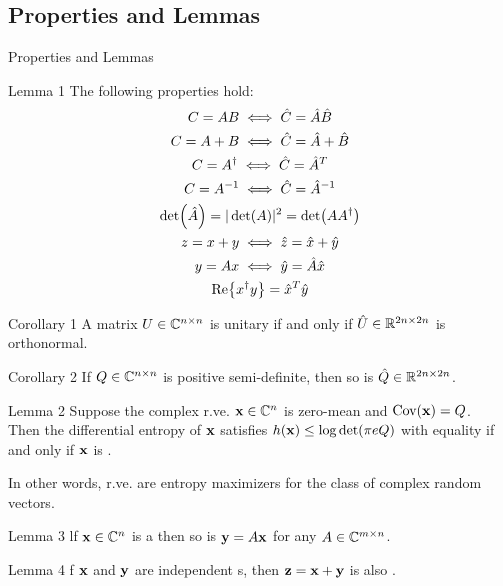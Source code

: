 \subsection{Properties and Lemmas}
\begin{frame}[allowframebreaks]{Properties and Lemmas}
\begin{block}{Lemma 1}
	The following properties hold:
	\begin{subequations}
	\begin{gather}
	C=AB \iff \hat{C} = \hat{A}\hat{B}\\
	C = A+B \iff \hat{C} = \hat{A} + \hat{B}\\
	C = A^\dagger \iff \hat{C}=\hat{A}^T\\
	C=A^{-1} \iff \hat{C} = \hat{A}^{-1}\\
	\det(\hat{A}) = |\det(A)|^2 = \det(A A^\dagger)\\
	z = x+y \iff \hat{z} = \hat{x}+\hat{y}\\
	y=Ax \iff \hat{y} = \hat{A}\hat{x}\\
	\Re{\ensuremath{x^\dagger}y} = \hat{x}^T\hat{y}
	\end{gather}
	\end{subequations}
\end{block}

\framebreak

\begin{block}{Corollary 1}
A matrix $U\in \mathbb{C}^{n\times n}$ is unitary if and only if $\hat{U}\in \mathbb{R}^{2n\times 2n}$ is orthonormal.
\end{block}
\begin{block}{Corollary 2}
If $Q\in \mathbb{C}^{n\times n}$ is positive semi-definite, then so is $\hat{Q}\in \mathbb{R}^{2n\times 2n}$.
\end{block}
\begin{alertblock}{Lemma 2}\justify
Suppose the complex r.ve. $\vb{x}\in \mathbb{C}^{n}$ is
zero-mean and $\text{Cov}\qty(\vb{x})=Q$.\\
Then the differential entropy of $\vb{x}$ satisfies $h(\vb{x}) \leq \log\det(\pi e Q)$ with equality if and only if $\vb{x}$ is \cscg.
\end{alertblock}
In other words, \cscg r.ve. are entropy maximizers for the class of complex random vectors.

\framebreak

\begin{block}{Lemma 3}
lf $\vb{x}\in \mathbb{C}^{n}$ is a \cscg then so is $\vb{y} = A\vb{x}$ for any $A \in \mathbb{C}^{m\times n}$.
\end{block}
\begin{block}{Lemma 4}\label{lemma:4}
	f $\vb{x}$ and $\vb{y}$ are independent {\cscg s}, then $\vb{z}=\vb{x}+\vb{y}$ is also \cscg.
\end{block}

\end{frame}

